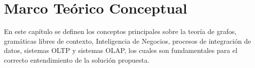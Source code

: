 \chapter{Marco Te\'orico Conceptual}\label{chapter:teoricframe}

En este cap\'itulo se definen los conceptos principales sobre la teoría de grafos, gram\'aticas 
libres de contexto, Inteligencia de Negocios, procesos de integración de datos, sistemas OLTP y sistemas OLAP, 
los cuales son fundamentales para el correcto entendimiento de la soluci\'on propuesta.







